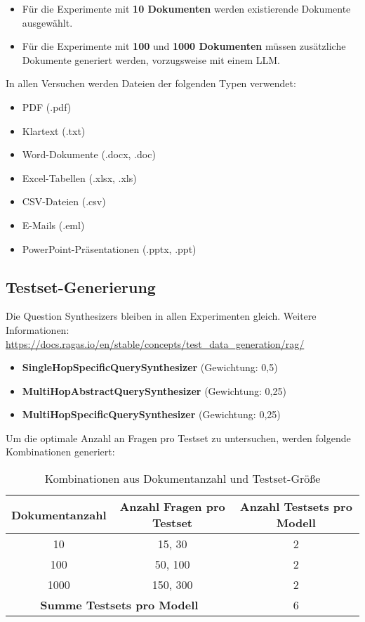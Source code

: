 \begin{itemize}
    \item Für die Experimente mit \textbf{10 Dokumenten} werden existierende Dokumente ausgewählt.
    \item Für die Experimente mit \textbf{100} und \textbf{1000 Dokumenten} müssen zusätzliche Dokumente generiert werden, vorzugsweise mit einem LLM.
\end{itemize}

\noindent
In allen Versuchen werden Dateien der folgenden Typen verwendet:

\begin{itemize}
    \item PDF (.pdf)
    \item Klartext (.txt)
    \item Word-Dokumente (.docx, .doc)
    \item Excel-Tabellen (.xlsx, .xls)
    \item CSV-Dateien (.csv)
    \item E-Mails (.eml)
    \item PowerPoint-Präsentationen (.pptx, .ppt)
\end{itemize}

\subsection{Testset-Generierung}
Die Question Synthesizers bleiben in allen Experimenten gleich.  
Weitere Informationen: \url{https://docs.ragas.io/en/stable/concepts/test_data_generation/rag/}

\begin{itemize}
    \item \textbf{SingleHopSpecificQuerySynthesizer} (Gewichtung: 0{,}5)
    \item \textbf{MultiHopAbstractQuerySynthesizer} (Gewichtung: 0{,}25)
    \item \textbf{MultiHopSpecificQuerySynthesizer} (Gewichtung: 0{,}25)
\end{itemize}

Um die optimale Anzahl an Fragen pro Testset zu untersuchen, werden folgende Kombinationen generiert:

\begin{table}[htbp]
    \centering
    \begin{tabular}{|c|c|c|}
        \hline
        \textbf{Dokumentanzahl} & \textbf{Anzahl Fragen pro Testset} & \textbf{Anzahl Testsets pro Modell} \\
        \hline
        10   & 15, 30    & 2 \\
        100  & 50, 100   & 2 \\
        1000 & 150, 300  & 2 \\
        \hline
        \multicolumn{2}{|c|}{\textbf{Summe Testsets pro Modell}} & 6 \\
        \hline
    \end{tabular}
    \caption{Kombinationen aus Dokumentanzahl und Testset-Größe}
\end{table}

